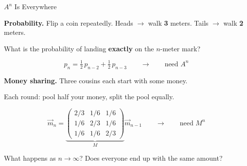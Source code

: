 \documentclass[10pt]{beamer}
\theoremstyle{definition}
\newcommand{\x}[1]{\alert{\textbf{#1}}}
\begin{document}
\begin{frame}[shrink=5]{$A^n$ Is Everywhere}

\textbf{Probability.}\; Flip a coin repeatedly.
Heads $\to$ walk \x{3} meters. \; Tails $\to$ walk \x{2} meters.

What is the probability of landing \x{exactly} on the $n$-meter mark?

\vfill

$$p_n = \tfrac{1}{2}\,p_{n-2} + \tfrac{1}{2}\,p_{n-3} \qquad\longrightarrow\qquad \text{need } A^n$$

\vfill\pause

\textbf{Money sharing.}\; Three cousins each start with some money.

Each round: pool half your money, split the pool equally.

\vfill

$$\vec{m}_n = \underbrace{\begin{pmatrix}2/3&1/6&1/6\\1/6&2/3&1/6\\1/6&1/6&2/3\end{pmatrix}}_{M} \vec{m}_{n-1}
\qquad\longrightarrow\qquad \text{need } M^n$$

\vfill

What happens as $n \to \infty$? \; Does everyone end up with the same amount?

\end{frame}
\end{document}
